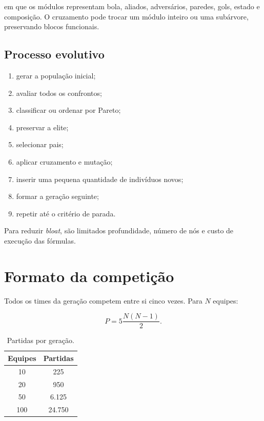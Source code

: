 \documentclass[12pt,a4paper]{article}
\begin{document}
em que os m\'odulos representam bola, aliados, advers\'arios, paredes, gols, estado e composi\c{c}\~ao. O cruzamento pode trocar um m\'odulo inteiro ou uma sub\'arvore, preservando blocos funcionais.

\subsection{Processo evolutivo}

\begin{enumerate}
  \item gerar a popula\c{c}\~ao inicial;
  \item avaliar todos os confrontos;
  \item classificar ou ordenar por Pareto;
  \item preservar a elite;
  \item selecionar pais;
  \item aplicar cruzamento e muta\c{c}\~ao;
  \item inserir uma pequena quantidade de indiv\'iduos novos;
  \item formar a gera\c{c}\~ao seguinte;
  \item repetir at\'e o crit\'erio de parada.
\end{enumerate}

Para reduzir \textit{bloat}, s\~ao limitados profundidade, n\'umero de n\'os e custo de execu\c{c}\~ao das f\'ormulas.

\section{Formato da competi\c{c}\~ao}

Todos os times da gera\c{c}\~ao competem entre si cinco vezes. Para $N$ equipes:

\begin{equation}
  P=5\frac{N(N-1)}{2}.
\end{equation}

\begin{table}[ht]
\centering
\caption{Partidas por gera\c{c}\~ao.}
\begin{tabular}{cc}
\toprule
Equipes & Partidas \\
\midrule
10 & 225 \\
20 & 950 \\
50 & 6.125 \\
100 & 24.750 \\
\bottomrule
\end{tabular}
\end{table}
\end{document}
